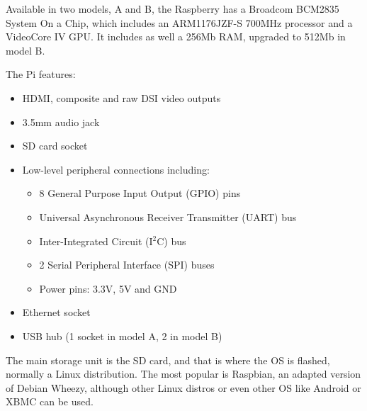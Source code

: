 	Available in two models, A and B, the Raspberry has a Broadcom BCM2835 System On a Chip, which includes an ARM1176JZF-S 700MHz processor and a VideoCore IV GPU. It includes as well a 256Mb RAM, upgraded to 512Mb in model B.\\

	\bigskip

	The Pi features: 
		\begin{itemize}
			  \item HDMI, composite and raw DSI video outputs
			  \item 3.5mm audio jack
			  \item SD card socket
			  \item Low-level peripheral connections including:
			  	\begin{itemize}
			  	\item 8 General Purpose Input Output (GPIO) pins
			  	\item Universal Asynchronous Receiver Transmitter (UART) bus
			  	\item Inter-Integrated Circuit (I$^2$C) bus
			  	\item 2 Serial Peripheral Interface (SPI) buses
			  	\item Power pins: 3.3V, 5V and GND
			  	\end{itemize}
			  \item Ethernet socket
			  \item USB hub (1 socket in model A, 2 in model B)

		\end{itemize}

	The main storage unit is the SD card, and that is where the OS is flashed, normally a Linux distribution. The most popular is Raspbian, an adapted version of Debian Wheezy, although other Linux distros or even other OS like Android or XBMC can be used.

